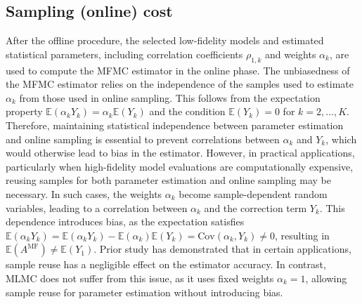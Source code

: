 \subsection{Sampling (online) cost}
After the offline procedure, the selected low-fidelity models and estimated statistical parameters, including correlation coefficients
$\rho_{1,k}$ and weights $\alpha_k$, are used to compute the MFMC estimator in the online phase. The unbiasedness of the MFMC estimator relies on the independence of the samples used to estimate $\alpha_k$ from those used in online sampling. This follows from the expectation property $\mathbb{E}(\alpha_k Y_k) = \alpha_k \mathbb{E}(Y_k)$ and the condition $\mathbb{E}(Y_k) = 0$ for $k=2,\ldots, K$. Therefore, maintaining statistical independence between parameter estimation and online sampling is essential to prevent correlations between $\alpha_k$ and $Y_k$, which would otherwise lead to bias in the estimator. However, in practical applications, particularly when high-fidelity model evaluations are computationally expensive, reusing samples for both parameter estimation and online sampling may be necessary. In such cases, the weights $\alpha_k$ become sample-dependent random variables, leading to a correlation between $\alpha_k$  and the correction term $Y_k$. This dependence introduces bias, as the expectation satisfies $\mathbb{E}(\alpha_k Y_k) = \mathbb{E}(\alpha_k Y_k)-\mathbb{E}(\alpha_k)\mathbb{E}(Y_k) = \text{Cov}(\alpha_k,Y_k)\neq 0$, resulting in $\mathbb{E}(A^{\text{MF}})\neq \mathbb{E}(Y_1)$. Prior study \cite{KoFaPeDiJeNeBu:2022} has demonstrated that in certain applications, sample reuse has a negligible effect on the estimator accuracy.  In contrast, MLMC does not suffer from this issue, as it uses fixed weights $\alpha_k =1$, allowing sample reuse for parameter estimation without introducing bias.

